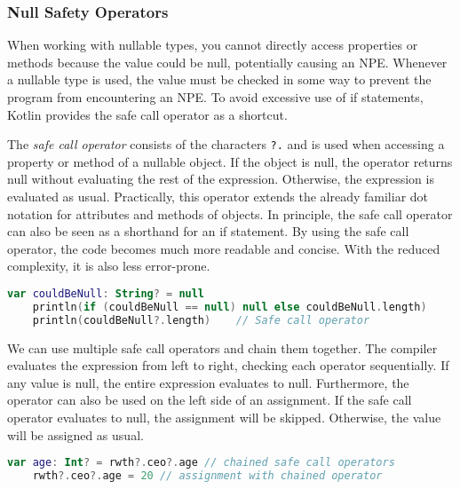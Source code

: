 \documentclass[a4paper, 11pt]{article}
\begin{document}
\subsubsection{Null Safety Operators}
  When working with nullable types, you cannot directly access properties or methods because the value could be null, potentially causing an NPE. Whenever a nullable type is used, the value must be checked in some way to prevent the program from encountering an NPE. To avoid excessive use of if statements, Kotlin provides the safe call operator as a shortcut.

  The \textit{safe call operator} consists of the characters \texttt{?.} and is used when accessing a property or method of a nullable object. If the object is null, the operator returns null without evaluating the rest of the expression. Otherwise, the expression is evaluated as usual. Practically, this operator extends the already familiar dot notation for attributes and methods of objects. In principle, the safe call operator can also be seen as a shorthand for an if statement. By using the safe call operator, the code becomes much more readable and concise. With the reduced complexity, it is also less error-prone.

  \begin{lstlisting}[language=Kotlin,title={Using the safe call operator in comparison to an if statement}]
    var couldBeNull: String? = null
    println(if (couldBeNull == null) null else couldBeNull.length)
    println(couldBeNull?.length)    // Safe call operator
  \end{lstlisting}
  We can use multiple safe call operators and chain them together. The compiler evaluates the expression from left to right, checking each operator sequentially. If any value is null, the entire expression evaluates to null.
  Furthermore, the operator can also be used on the left side of an assignment. If the safe call operator evaluates to null, the assignment will be skipped. Otherwise, the value will be assigned as usual.
  \begin{lstlisting}[language=Kotlin]
    var age: Int? = rwth?.ceo?.age // chained safe call operators
    rwth?.ceo?.age = 20 // assignment with chained operator
  \end{lstlisting}
\end{document}
